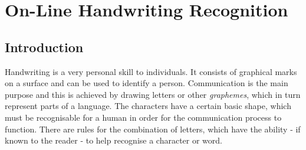 ﻿%

\chapter{On-Line Handwriting Recognition}
\label{chap:onlinehwr}



\section{Introduction}
\label{sec:onlinehwrintroduction}


Handwriting is a very personal skill to individuals. It consists of graphical
marks on a surface and can be used to identify a person. 
Communication is the main purpose and this is achieved by drawing letters or other 
\emph{graphemes}, which in turn represent parts of a language.
The characters have a certain basic shape, which must be recognisable
for a human in order for the communication process to function.
There are rules for the combination of letters, which have the ability - if
known to the reader - to help recognise a character or word.

